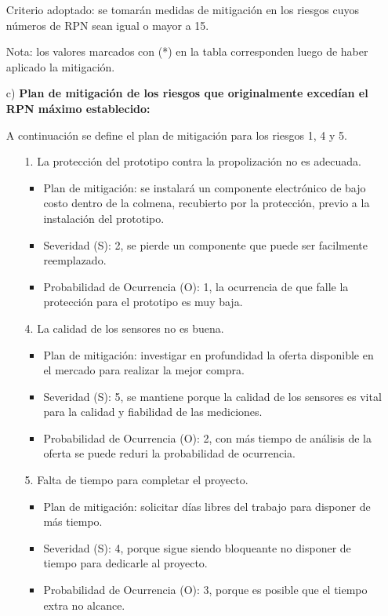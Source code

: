 \documentclass[
11pt, %
codirector, %
]{charter}
\begin{document}
\begin{itemize}[font=\bfseries]
	Criterio adoptado: se tomarán medidas de mitigación en los riesgos cuyos números de RPN sean igual o mayor a 15.
	
	Nota: los valores marcados con (*) en la tabla corresponden luego de haber aplicado la mitigación.	
	
	\item[c)] {\bf Plan de mitigación de los riesgos que originalmente excedían el RPN máximo establecido:}
	
	A continuación se define el plan de mitigación para los riesgos 1, 4 y 5.
	
		\begin{enumerate}
			\item[1.] La protección del prototipo contra la propolización no es adecuada.
			\begin{itemize}
				\item Plan de mitigación: se instalará un componente electrónico de bajo costo dentro de la colmena, recubierto por la protección, previo a la instalación del prototipo.
				\item Severidad (S): 2, se pierde un componente que puede ser facilmente reemplazado.
				\item Probabilidad de Ocurrencia (O): 1, la ocurrencia de que falle la protección para el prototipo es muy baja.
			\end{itemize}
			\item[4.] La calidad de los sensores no es buena.
			\begin{itemize}
				\item Plan de mitigación: investigar en profundidad la oferta disponible en el mercado para realizar la mejor compra.
				\item Severidad (S): 5, se mantiene porque la calidad de los sensores es vital para la calidad y fiabilidad de las mediciones. 
				\item Probabilidad de Ocurrencia (O): 2, con más tiempo de análisis de la oferta se puede reduri la probabilidad de ocurrencia.
			\end{itemize}			
			\item[5.] Falta de tiempo para completar el proyecto.
			\begin{itemize}
				\item Plan de mitigación: solicitar días libres del trabajo para disponer de más tiempo.
				\item Severidad (S): 4, porque sigue siendo bloqueante no disponer de tiempo para dedicarle al proyecto. 
				\item Probabilidad de Ocurrencia (O): 3, porque es posible que el tiempo extra no alcance.
			\end{itemize}			
			
		\end{enumerate}
\end{itemize}
\end{document}
